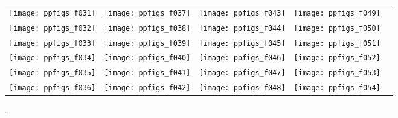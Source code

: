 \documentclass[sigconf]{acmart}
\begin{document}
{%



\begin{figure*}
\centering
\begin{tabular}{@{}c@{}c@{}c@{}c@{}c@{}}
\texttt{[image: ppfigs\_f031]}&
\texttt{[image: ppfigs\_f037]}&
\texttt{[image: ppfigs\_f043]}&
\texttt{[image: ppfigs\_f049]}\\[-0.25em]
\texttt{[image: ppfigs\_f032]}&
\texttt{[image: ppfigs\_f038]}&
\texttt{[image: ppfigs\_f044]}&
\texttt{[image: ppfigs\_f050]}\\[-0.25em]
\texttt{[image: ppfigs\_f033]}&
\texttt{[image: ppfigs\_f039]}&
\texttt{[image: ppfigs\_f045]}&
\texttt{[image: ppfigs\_f051]}\\[-0.25em]
\texttt{[image: ppfigs\_f034]}&
\texttt{[image: ppfigs\_f040]}&
\texttt{[image: ppfigs\_f046]}&
\texttt{[image: ppfigs\_f052]}\\[-0.25em]
\texttt{[image: ppfigs\_f035]}&
\texttt{[image: ppfigs\_f041]}&
\texttt{[image: ppfigs\_f047]}&
\texttt{[image: ppfigs\_f053]}\\[-0.25em]
\texttt{[image: ppfigs\_f036]}&
\texttt{[image: ppfigs\_f042]}&
\texttt{[image: ppfigs\_f048]}&
\texttt{[image: ppfigs\_f054]}
\end{tabular}
\vspace*{-0.2cm}
\caption[Expected running time (\ERT) divided by dimension
versus dimension in log-log presentation]{
\label{fig:scaling2}
. 
}
% 
\end{figure*}

 
}
\end{document}
